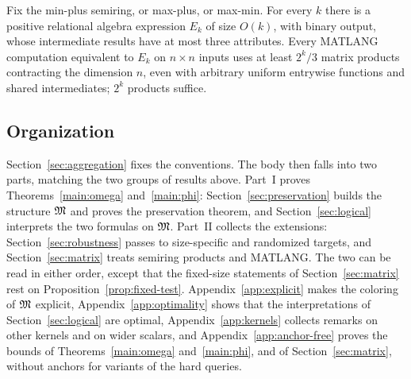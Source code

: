 \begin{theorem}\label{main:matrix-informal}
Fix the min-plus semiring, or max-plus, or max-min. For every $k$ there is a
positive relational algebra expression $E_k$ of size $O(k)$, with binary
output, whose intermediate results have at most three attributes. Every
MATLANG computation equivalent to $E_k$ on $n\times n$ inputs uses at least
$2^k/3$ matrix products contracting the dimension $n$, even with arbitrary
uniform entrywise functions and shared intermediates; $2^k$ products
suffice.
\end{theorem}





\subsection{Organization}
Section~\ref{sec:aggregation} fixes the conventions. The body then falls
into two parts, matching the two groups of results above. Part~I proves
Theorems~\ref{main:omega} and~\ref{main:phi}:
Section~\ref{sec:preservation} builds the structure $\mathfrak M$ and proves the
preservation theorem, and Section~\ref{sec:logical} interprets the two
formulas on $\mathfrak M$. Part~II collects the extensions:
Section~\ref{sec:robustness} passes to size-specific and randomized targets,
and Section~\ref{sec:matrix} treats semiring products and MATLANG. The two
can be read in either order, except that the fixed-size statements of
Section~\ref{sec:matrix} rest on Proposition~\ref{prop:fixed-test}.
Appendix~\ref{app:explicit} makes the coloring of $\mathfrak M$ explicit,
Appendix~\ref{app:optimality} shows that the interpretations of
Section~\ref{sec:logical} are optimal, Appendix~\ref{app:kernels}
collects remarks on other kernels and on wider scalars, and
Appendix~\ref{app:anchor-free} proves the bounds of
Theorems~\ref{main:omega} and~\ref{main:phi}, and of
Section~\ref{sec:matrix}, without anchors for variants of the hard
queries.
